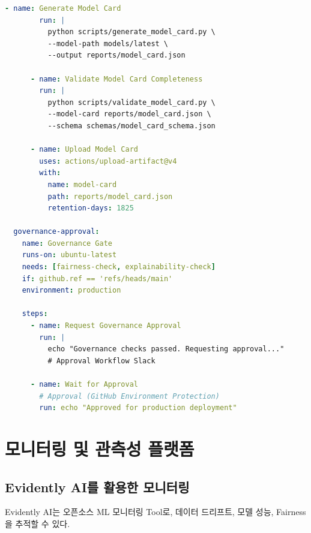 \begin{lstlisting}[language=yaml, caption={GitHub Actions Governance Pipeline}, label={lst:github_actions}]
      - name: Generate Model Card
        run: |
          python scripts/generate_model_card.py \
          --model-path models/latest \
          --output reports/model_card.json
      
      - name: Validate Model Card Completeness
        run: |
          python scripts/validate_model_card.py \
          --model-card reports/model_card.json \
          --schema schemas/model_card_schema.json
      
      - name: Upload Model Card
        uses: actions/upload-artifact@v4
        with:
          name: model-card
          path: reports/model_card.json
          retention-days: 1825
  
  governance-approval:
    name: Governance Gate
    runs-on: ubuntu-latest
    needs: [fairness-check, explainability-check]
    if: github.ref == 'refs/heads/main'
    environment: production
    
    steps:
      - name: Request Governance Approval
        run: |
          echo "Governance checks passed. Requesting approval..."
          # Approval Workflow Slack 
      
      - name: Wait for Approval
        # Approval (GitHub Environment Protection)
        run: echo "Approved for production deployment"
\end{lstlisting}

\section{모니터링 및 관측성 플랫폼}
\label{sec:6.5}

\subsection{Evidently AI를 활용한 모니터링}
\label{sec:6.5.1}

Evidently AI는 오픈소스 ML 모니터링 Tool로, 
데이터 드리프트, 모델 성능, Fairness을 추적할 수 있다.


